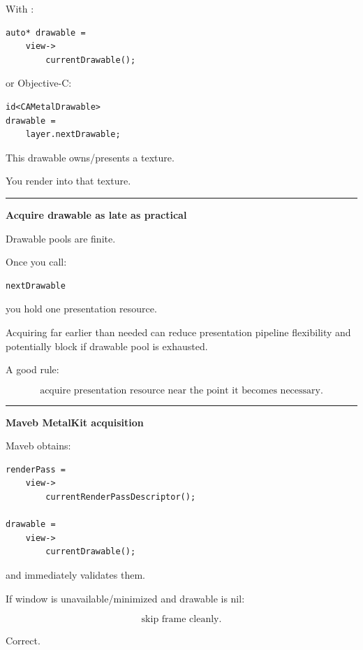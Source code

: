 With :

\begin{verbatim}
auto* drawable =
    view->
        currentDrawable();
\end{verbatim}

or Objective-C:

\begin{verbatim}
id<CAMetalDrawable>
drawable =
    layer.nextDrawable;
\end{verbatim}

This drawable owns/presents a texture.

You render into that texture.

\begin{center}\rule{0.5\linewidth}{0.5pt}\end{center}

\textbf{Acquire drawable as late as practical}

Drawable pools are finite.

Once you call:

\begin{verbatim}
nextDrawable
\end{verbatim}

you hold one presentation resource.

Acquiring far earlier than needed can reduce presentation pipeline flexibility and potentially block if drawable pool is exhausted.

A good rule:

\[
\boxed{
\text{acquire presentation resource near the point it becomes necessary}.
}
\]

\begin{center}\rule{0.5\linewidth}{0.5pt}\end{center}

\textbf{Maveb MetalKit acquisition}

Maveb obtains:

\begin{verbatim}
renderPass =
    view->
        currentRenderPassDescriptor();

drawable =
    view->
        currentDrawable();
\end{verbatim}

and immediately validates them.

If window is unavailable/minimized and drawable is nil:

\[
\boxed{
\text{skip frame cleanly}.
}
\]

Correct.

